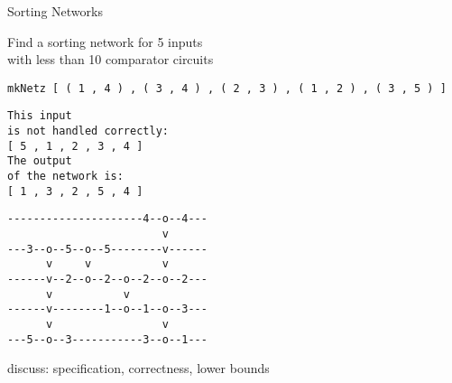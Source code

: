 \begin{slide}{Sorting Networks}


Find a sorting network for 5 inputs \\
with less than 10 comparator circuits


\begin{small}
\begin{verbatim}
mkNetz [ ( 1 , 4 ) , ( 3 , 4 ) , ( 2 , 3 ) , ( 1 , 2 ) , ( 3 , 5 ) ]
\end{verbatim}
\end{small}


\begin{minipage}{0.4\textwidth}
\begin{small}
\begin{verbatim}
This input
is not handled correctly:
[ 5 , 1 , 2 , 3 , 4 ]
The output
of the network is:
[ 1 , 3 , 2 , 5 , 4 ]
\end{verbatim}
\end{small}
\end{minipage}%
\begin{minipage}{0.5\textwidth}
\begin{small}
\begin{verbatim}
---------------------4--o--4---
                        v      
---3--o--5--o--5--------v------
      v     v           v      
------v--2--o--2--o--2--o--2---
      v           v            
------v--------1--o--1--o--3---
      v                 v      
---5--o--3-----------3--o--1---
\end{verbatim}
\end{small}
\end{minipage}

discuss: specification, correctness, lower bounds


\end{slide}

